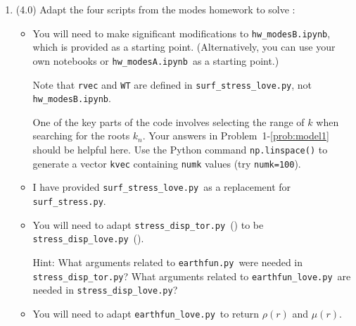 \documentclass[11pt,titlepage,fleqn]{article}
\newcommand{\tfileA}{{\tt hw\_modesA.ipynb}}
\newcommand{\tfileB}{{\tt surf\_stress.py}}
\newcommand{\tfileC}{{\tt stress\_disp\_tor.py}}
\newcommand{\tfileD}{{\tt earthfun.py}}
\newcommand{\tfileAA}{{\tt hw\_modesB.ipynb}}
\newcommand{\tfileBB}{{\tt surf\_stress\_love.py}}
\newcommand{\tfileCC}{{\tt stress\_disp\_love.py}}
\newcommand{\tfileDD}{{\tt earthfun\_love.py}}
\begin{document}

\begin{enumerate}

\item (4.0) Adapt the four scripts from the modes homework to solve :
%
\begin{itemize}
\item You will need to make significant modifications to \tfileAA, which is provided as a starting point. (Alternatively, you can use your own notebooks or \tfileA\ as a starting point.)

%
%
Note that \verb+rvec+ and \verb+WT+ are defined in \tfileBB, not \tfileAA.

One of the key parts of the code involves selecting the range of $k$ when searching for the roots $k_n$.
Your answers in Problem~1-\ref{prob:model1} should be helpful here.
Use the Python command \verb+np.linspace()+ to generate a vector \verb+kvec+ containing \verb+numk+ values (try \verb+numk=100+).

\item I have provided \tfileBB\ as a replacement for \tfileB.

\item You will need to adapt \tfileC\ () to be \tfileCC\ ().

Hint: What arguments related to \tfileD\ were needed in \tfileC? What arguments related to \tfileDD\ are needed in \tfileCC?

\item You will need to adapt \tfileDD\ to return $\rho(r)$ and $\mu(r)$.


\end{itemize}


\end{enumerate}
\end{document}
